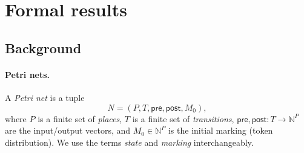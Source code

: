 \section{Formal results}
\label{sec:formal-results}



\subsection{Background}

\paragraph{Petri nets.}
A \emph{Petri net} is a tuple
\[
N = (P, T, \mathsf{pre}, \mathsf{post}, M_0),
\]
where \(P\) is a finite set of \emph{places}, \(T\) is a finite set of \emph{transitions},
\(\mathsf{pre},\mathsf{post}:T\to\mathbb N^P\) are the input/output vectors, and
\(M_0\in\mathbb N^P\) is the initial marking (token distribution). We use the terms \textit{state} and \textit{marking} interchangeably.

